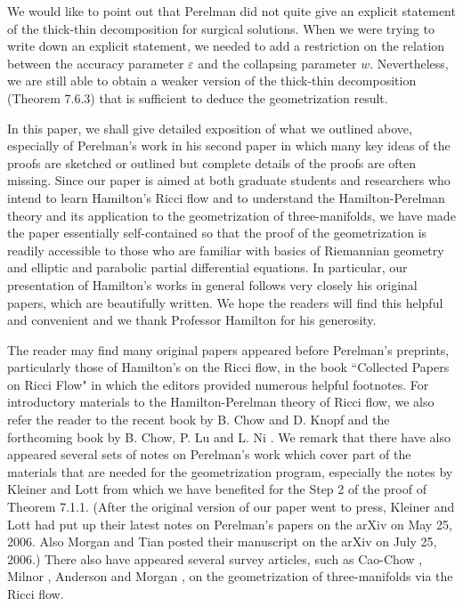 We would like to point out that Perelman \cite{P2} did not quite
give an explicit statement of the thick-thin decomposition for
surgical solutions. When we were trying to write down an explicit
statement, we needed to add a restriction on the relation between
the accuracy parameter $\varepsilon$ and the collapsing parameter
$w$. Nevertheless, we are still able to obtain a weaker version of
the thick-thin decomposition (Theorem 7.6.3) that is sufficient to
deduce the geometrization result.

In this paper, we shall give detailed exposition of what we
outlined above, especially of Perelman's work in his second paper
\cite{P2} in which many key ideas of the proofs are sketched or
outlined but complete details of the proofs are often missing.
Since our paper is aimed at both graduate students and researchers
who intend to learn Hamilton's Ricci flow and to understand the
Hamilton-Perelman theory and its application to the geometrization
of three-manifolds, we have made the paper essentially
self-contained so that the proof of the geometrization is readily
accessible to those who are familiar with basics of Riemannian
geometry and elliptic and parabolic partial differential
equations. In particular, our presentation of Hamilton's works in
general follows very closely his original papers, which are
beautifully written. We hope the readers will find this helpful
and convenient and we thank Professor Hamilton for his generosity.

The reader may find many original papers appeared before
Perelman's preprints, particularly those of Hamilton's on the
Ricci flow, in the book ``Collected Papers on Ricci Flow"
\cite{CCCY} in which the editors provided numerous helpful
footnotes. For introductory materials to the Hamilton-Perelman
theory of Ricci flow, we also refer the reader to the recent book
by B. Chow and D. Knopf \cite{CK04} and the forthcoming book by B.
Chow, P. Lu and L. Ni \cite{CLN}. We remark that there have also
appeared several sets of notes on Perelman's work which cover part
of the materials that are needed for the geometrization program,
especially the notes by Kleiner and Lott \cite{KL} from which we
have benefited for the Step 2 of the proof of Theorem 7.1.1.
(After the original version of our paper went to press, Kleiner
and Lott had put up their latest notes \cite{KL2} on Perelman's
papers on the arXiv on May 25, 2006. Also Morgan and Tian posted
their manuscript \cite{MT} on the arXiv on July 25, 2006.) There
also have appeared several survey articles, such as Cao-Chow
\cite{CC99}, Milnor \cite{Mil}, Anderson \cite{An} and Morgan
\cite{Mor}, on the geometrization of three-manifolds via the Ricci
flow.

